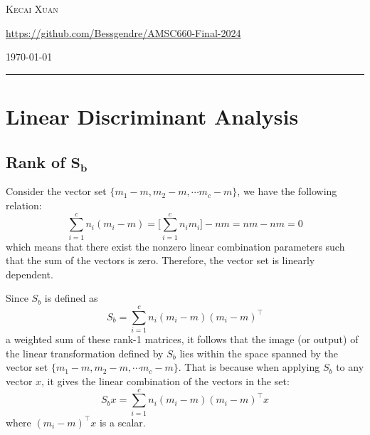 \documentclass[12pt]{article}
\newcommand{\0}{\boldsymbol{0}}
\begin{document}
\begin{titlepage}
    \vspace{0.013\textheight}

    {\large \textsc{Kecai Xuan}}

    \vspace{0.013\textheight}

    {\large \href{https://github.com/Bessgendre/AMSC660-Final-2024}{https://github.com/Bessgendre/AMSC660-Final-2024}}

    \vspace{0.013\textheight}

    \vspace{0.04\textheight}


    \vfill  %

    {\large \today}  %
    \vspace{0.04\textheight}  %


    \rule{\textwidth}{1pt}  %

\end{titlepage}

\section{Linear Discriminant Analysis}

\subsection{Rank of $\mathbf{S_b}$}

Consider the vector set $\{m_1 - m, m_2 - m,\cdots m_c-m\}$, we have the following relation:
\[
    \sum_{i=1}^c n_i\left(m_i-m\right)=\bigg[\sum_{i=1}^c n_i m_i\bigg]-n m=n m-n m=0
\]
which means that there exist the nonzero linear combination parameters such that the sum of the vectors is zero. Therefore, the vector set is linearly dependent.

Since $S_b$ is defined as
\[
    \displaystyle S_b=\sum_{i=1}^c n_i\left(m_i-m\right)\left(m_i-m\right)^\top
\]
a weighted sum of these rank-1 matrices, it follows that the image (or output) of the linear transformation defined by $S_b$ lies within the space spanned by the vector set $\{m_1 - m, m_2 - m,\cdots m_c-m\}$. That is because when applying $S_b$ to any vector $x$, it gives the linear combination of the vectors in the set:
\[
    S_b x = \sum_{i=1}^c n_i\left(m_i-m\right)\left(m_i-m\right)^\top x
\]
where $\left(m_i-m\right)^\top x$ is a scalar. 
\end{document}
